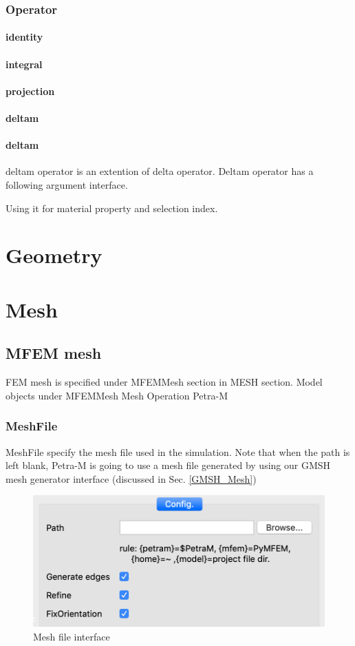 \documentclass[11pt,a4paper,final]{report}
\begin{document}
\subsection{Operator}
\subsubsection{identity}            
\subsubsection{integral}
\subsubsection{projection}
\subsubsection{deltam}
\subsubsection{deltam}
deltam operator is an extention of delta operator. Deltam operator has a following argument interface.


Using it for material property and selection index.
\chapter{Geometry}

\chapter{Mesh}

\section{MFEM mesh}
FEM mesh is specified under MFEMMesh section in MESH section. Model objects under MFEMMesh
Mesh Operation Petra-M

\subsection{MeshFile}
MeshFile specify the mesh file used in the simulation. Note that when the path is left blank, Petra-M is going to use
a mesh file generated by using our GMSH mesh generator interface (discussed in Sec. \ref{GMSH_Mesh})

\begin{figure}
\centering
\includegraphics[width=0.75\columnwidth]{figures/mesh_file_gui.png} 
\caption{ Mesh file interface}\label{mesh_file}
\end{figure}
\end{document}
